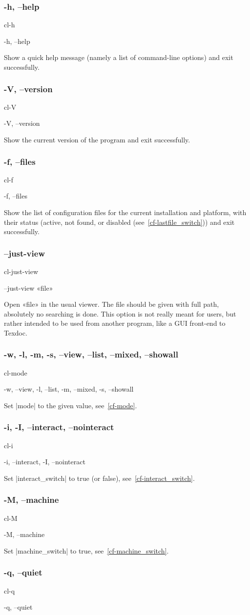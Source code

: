 \documentclass[a4paper, oneside]{scrartcl}
\newif\ifframed
\newenvironment{cmdsubsub}[2]{%
  \framedfalse \commandes\subsubsection{#1}{#2}%
  }{%
  \endcommandes}
\begin{document}
\begin{cmdsubsub}{-h, --help}{cl-h}
  -h, --help
\end{cmdsubsub}

Show a quick help message (namely a list of command-line options) and exit
successfully.

\begin{cmdsubsub}{-V, --version}{cl-V}
  -V, --version
\end{cmdsubsub}

Show the current version of the program and exit successfully.

\begin{cmdsubsub}{-f, --files}{cl-f}
  -f, --files
\end{cmdsubsub}

Show the list of configuration files for the current installation and
platform, with their status (active, not found, or disabled
(see~\ref{cf-lastfile_switch})) and exit successfully.

\begin{cmdsubsub}{--just-view}{cl-just-view}
  --just-view «file»
\end{cmdsubsub}

Open «file» in the usual viewer. The file should be given with full path,
absolutely no searching is done. This option is not really meant for users,
but rather intended to be used from another program, like a GUI front-end to
Texdoc.

\begin{cmdsubsub}{-w, -l, -m, -s, --view, --list, --mixed, --showall}{cl-mode}
  -w, --view, -l, --list, -m, --mixed, -s, --showall
\end{cmdsubsub}

Set |mode| to the given value, see~\ref{cf-mode}.

\begin{cmdsubsub}{-i, -I, --interact, --nointeract}{cl-i}
  -i, --interact, -I, --nointeract
\end{cmdsubsub}

Set |interact_switch| to true (or false), see~\ref{cf-interact_switch}.

\begin{cmdsubsub}{-M, --machine}{cl-M}
  -M, --machine
\end{cmdsubsub}

Set |machine_switch| to true, see~\ref{cf-machine_switch}.

\begin{cmdsubsub}{-q, --quiet}{cl-q}
  -q, --quiet
\end{cmdsubsub}
\end{document}
